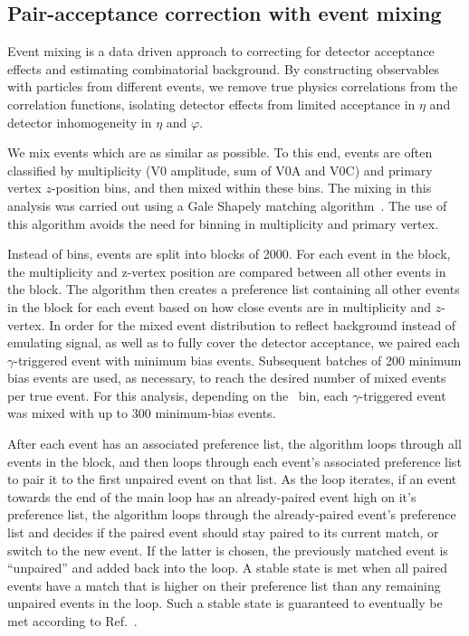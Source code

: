 


\subsection{Pair-acceptance correction with event mixing}
\label{sec:EventMixing}
Event mixing is a data driven approach to correcting for detector acceptance effects and estimating combinatorial background. By constructing observables with particles from different events, we remove true physics correlations from the correlation functions, isolating detector effects from limited acceptance in \(\eta\) and detector inhomogeneity in $\eta$ and $\varphi$. 

We mix events which are as similar as possible. To this end, events are often classified by multiplicity (V0 amplitude, sum of V0A and V0C) and primary vertex $z$-position bins, and then mixed within these bins. The mixing in this analysis was carried out using a Gale Shapely matching algorithm~\cite{GaleShapley:1962amm}. The use of this algorithm avoids the need for binning in multiplicity and primary vertex.

Instead of bins, events are split into blocks of 2000. For each event in the block, the multiplicity and z-vertex position are compared between all other events in the block. The algorithm then creates a preference list containing all other events in the block for each event based on how close events are in multiplicity and $z$-vertex. In order for the mixed event distribution to reflect background instead of emulating  signal, as well as to fully cover the detector acceptance, we paired each \(\gamma\)-triggered event with minimum bias events. Subsequent batches of 200 minimum bias events are used, as necessary, to reach the desired number of mixed events per true event. For this analysis, depending on the \zt~bin, each \(\gamma\)-triggered event was mixed with up to 300 minimum-bias events. 

After each event has an associated preference list, the algorithm loops through all events in the block, and then loops through each event's associated preference list to pair it to the first unpaired event on that list. As the loop iterates, if an event towards the end of the main loop has an already-paired event high on it’s preference list, the algorithm loops through the already-paired event's preference list and decides if the paired event should stay paired to its current match, or switch to the new event. If the latter is chosen, the previously matched event is “unpaired” and added back into the loop. A stable state is met when all paired events have a match that is higher on their preference list than any remaining unpaired events in the loop. Such a stable state is guaranteed to eventually be met according to Ref.~\cite{GaleShapley:1962amm}.

